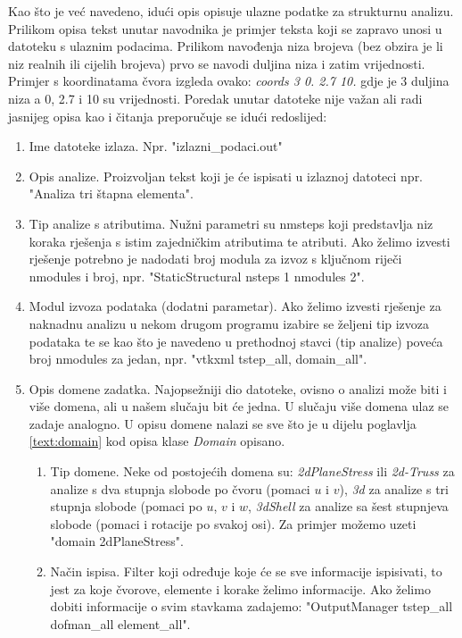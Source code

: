 \documentclass[a4paper,twoside,12pt]{memoir} %
\begin{document}
Kao što je već navedeno, idući opis opisuje ulazne podatke za strukturnu analizu. Prilikom opisa tekst unutar navodnika je primjer teksta koji se zapravo unosi u datoteku s ulaznim podacima. Prilikom navođenja niza brojeva (bez obzira je li niz realnih ili cijelih brojeva) prvo se navodi duljina niza i zatim vrijednosti. Primjer s koordinatama čvora izgleda ovako: \textit{coords 3 0.  2.7  10.} gdje je 3 duljina niza a 0, 2.7 i 10 su vrijednosti. Poredak unutar datoteke nije važan ali radi jasnijeg opisa kao i čitanja preporučuje se idući redoslijed:
\begin{enumerate}
    \item Ime datoteke izlaza. Npr. "izlazni\_podaci.out"
    \item Opis analize. Proizvoljan tekst koji je će ispisati u izlaznoj datoteci npr. "Analiza tri štapna elementa".
    \item Tip analize s atributima. Nužni parametri su nmsteps koji predstavlja niz koraka rješenja s istim zajedničkim atributima te atributi. Ako želimo izvesti rješenje potrebno je nadodati broj modula za izvoz s ključnom riječi nmodules i broj, npr. "StaticStructural nsteps 1 nmodules 2".
    \item Modul izvoza podataka (dodatni parametar). Ako želimo izvesti rješenje za naknadnu analizu u nekom drugom programu izabire se željeni tip izvoza podataka te se kao što je navedeno u prethodnoj stavci (tip analize) poveća broj nmodules za jedan, npr. "vtkxml tstep\_all, domain\_all".
    \item Opis domene zadatka. Najopsežniji dio datoteke, ovisno o analizi može biti i više domena, ali u našem slučaju bit će jedna. U slučaju više domena ulaz se zadaje analogno. U opisu domene nalazi se sve što je u dijelu poglavlja \ref{text:domain} kod opisa klase \textit{Domain} opisano.
    \begin{enumerate}
        \item Tip domene. Neke od postojećih domena su: \textit{2dPlaneStress} ili \textit{2d-Truss} za analize s dva stupnja slobode po čvoru (pomaci $u$ i $v$), \textit{3d} za analize s tri stupnja slobode (pomaci po $u$, $v$ i $w$, \textit{3dShell} za analize sa šest stupnjeva slobode (pomaci i rotacije po svakoj osi). Za primjer možemo uzeti "domain 2dPlaneStress".
        \item Način ispisa. Filter koji određuje koje će se sve informacije ispisivati, to jest za koje čvorove, elemente i korake želimo informacije. Ako želimo dobiti informacije o svim stavkama zadajemo: "OutputManager tstep\_all dofman\_all element\_all".

\end{enumerate}
\end{enumerate}
\end{document}
